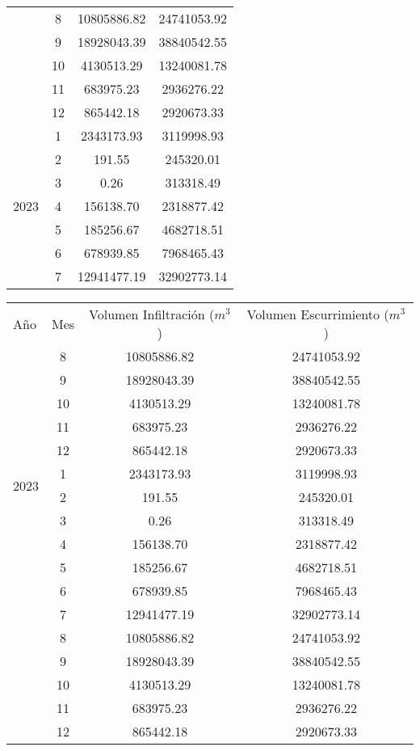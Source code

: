 \documentclass[12pt,letterpaper]{article}
\begin{document}
\begin{table}[H]
\begin{tabular}{l|c|c|c}
 & 8 & 10805886.82 & 24741053.92 \\
 & 9 & 18928043.39 & 38840542.55 \\
 & 10 & 4130513.29 & 13240081.78 \\
 & 11 & 683975.23 & 2936276.22 \\
 & 12 & 865442.18 & 2920673.33 \\
\cline{1-4}
\multirow[t]{12}{*}{2023} & 1 & 2343173.93 & 3119998.93 \\
 & 2 & 191.55 & 245320.01 \\
 & 3 & 0.26 & 313318.49 \\
 & 4 & 156138.70 & 2318877.42 \\
 & 5 & 185256.67 & 4682718.51 \\
 & 6 & 678939.85 & 7968465.43 \\
 & 7 & 12941477.19 & 32902773.14 \\
\cline{1-4}
\hline
\end{tabular}
\end{table}

\newpage
\begin{table}[H]
\centering
\begin{tabular}{l|c|c|c}
\hline
Año & Mes & Volumen Infiltración ($m^3$) & Volumen Escurrimiento ($m^3$) \\
\cline{1-4}
\multirow[t]{12}{*}{2023} & 8 & 10805886.82 & 24741053.92 \\
 & 9 & 18928043.39 & 38840542.55 \\
 & 10 & 4130513.29 & 13240081.78 \\
 & 11 & 683975.23 & 2936276.22 \\
 & 12 & 865442.18 & 2920673.33 \\
\cline{1-4}
\multirow[t]{12}{*}{2024} & 1 & 2343173.93 & 3119998.93 \\
 & 2 & 191.55 & 245320.01 \\
 & 3 & 0.26 & 313318.49 \\
 & 4 & 156138.70 & 2318877.42 \\
 & 5 & 185256.67 & 4682718.51 \\
 & 6 & 678939.85 & 7968465.43 \\
 & 7 & 12941477.19 & 32902773.14 \\
 & 8 & 10805886.82 & 24741053.92 \\
 & 9 & 18928043.39 & 38840542.55 \\
 & 10 & 4130513.29 & 13240081.78 \\
 & 11 & 683975.23 & 2936276.22 \\
 & 12 & 865442.18 & 2920673.33 \\
\cline{1-4}
\hline
\end{tabular}
\end{table}
\end{document}
